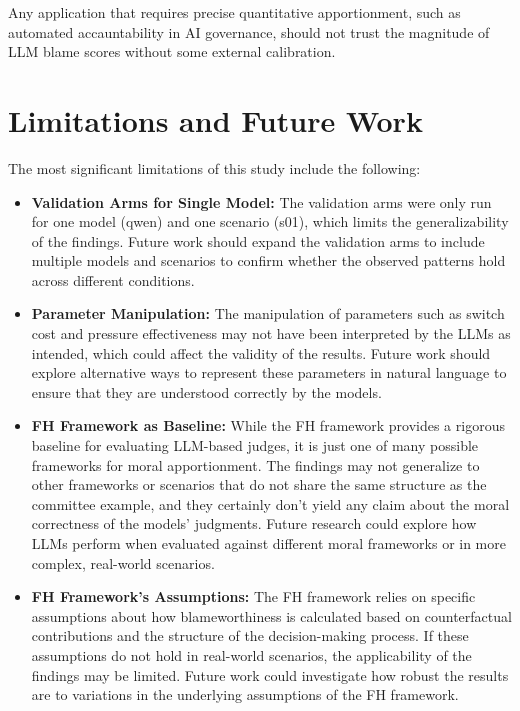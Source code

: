 \documentclass{article}
\begin{document}
Any application that requires precise quantitative apportionment, such as automated accauntability in AI governance, should not trust the magnitude of LLM blame scores without some external calibration.


\section{Limitations and Future Work}\label{sec:limitations}

The most significant limitations of this study include the following:

\begin{itemize}
  \item \textbf{Validation Arms for Single Model:} The validation arms were only run for one model (qwen) and one scenario (s01), which limits the generalizability of the findings. Future work should expand the validation arms to include multiple models and scenarios to confirm whether the observed patterns hold across different conditions. 
  
  \item \textbf{Parameter Manipulation:} The manipulation of parameters such as switch cost and pressure effectiveness may not have been interpreted by the LLMs as intended, which could affect the validity of the results. Future work should explore alternative ways to represent these parameters in natural language to ensure that they are understood correctly by the models.
  
  \item \textbf{FH Framework as Baseline:} While the FH framework provides a rigorous baseline for evaluating LLM-based judges, it is just one of many possible frameworks for moral apportionment. The findings may not generalize to other frameworks or scenarios that do not share the same structure as the committee example, and they certainly don't yield any claim about the moral correctness of the models' judgments. Future research could explore how LLMs perform when evaluated against different moral frameworks or in more complex, real-world scenarios.
  
  \item \textbf{FH Framework's Assumptions:} The FH framework relies on specific assumptions about how blameworthiness is calculated based on counterfactual contributions and the structure of the decision-making process. If these assumptions do not hold in real-world scenarios, the applicability of the findings may be limited. Future work could investigate how robust the results are to variations in the underlying assumptions of the FH framework.
  

\end{itemize}
\end{document}
